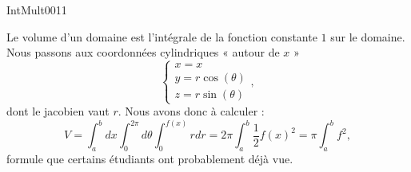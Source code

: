 
\begin{corrige}{IntMult0011}

	Le volume d'un domaine est l'intégrale de la fonction constante $1$ sur le domaine. Nous passons aux coordonnées cylindriques « autour de $x$ »
	\begin{equation}
		\left\{
		\begin{array}{ll}
			x=x\\
			y=r\cos(\theta)\\
			z=r\sin(\theta)
		\end{array}
		\right.,
	\end{equation}
	dont le jacobien vaut $r$. Nous avons donc à calculer :
	\begin{equation}
		V=\int_a^bdx\int_0^{2\pi}d\theta\int_0^{f(x)}rdr=2\pi\int_a^b\frac{1}{ 2 }f(x)^2=\pi\int_a^bf^2,
	\end{equation}
	formule que certains étudiants ont probablement déjà vue.

\end{corrige}
